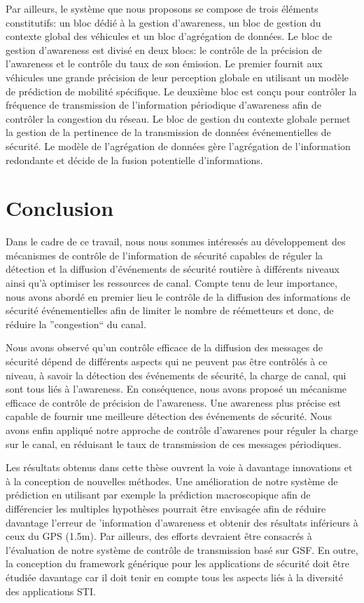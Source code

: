 Par ailleurs, le système que nous proposons se compose de trois éléments constitutifs: un bloc dédié à  la gestion d'awareness, un bloc de gestion du contexte global des véhicules et un bloc d'agrégation de données.
Le bloc de gestion d'awareness est divisé en deux blocs: le contrôle de la précision de l'awareness et le contrôle du taux de son émission. Le premier fournit aux véhicules une grande précision de leur perception globale en utilisant un modèle de prédiction de mobilité spécifique. Le deuxième bloc est conçu pour contrôler la fréquence de transmission de l'information périodique d'awareness afin de contrôler la congestion du réseau. Le bloc de gestion du contexte globale permet la gestion de la pertinence de la transmission de données événementielles de sécurité. Le modèle de l'agrégation de données gère l'agrégation de l'information redondante et décide de la fusion potentielle d'informations.

\section{Conclusion \label{conclusion}}

Dans le cadre de ce travail, nous nous sommes intéressés au développement des mécanismes de contrôle de l'information de sécurité capables de réguler la détection et la diffusion d'événements de sécurité routière à différents niveaux ainsi qu'à optimiser les ressources de canal.
Compte tenu de leur importance, nous avons abordé en premier lieu le contrôle de la diffusion des informations de sécurité événementielles afin de limiter le nombre de réémetteurs et donc, de réduire la ''congestion`` du canal.

Nous avons observé qu'un contrôle efficace de la diffusion des messages de sécurité dépend de différents aspects qui ne peuvent pas être contrôlés à ce niveau, à savoir la détection des événements de sécurité, la charge de canal, qui sont tous liés à l'awareness. En conséquence, nous avons proposé un mécanisme efficace de contrôle de précision de l'awareness.
Une awareness plus précise est capable de fournir une meilleure détection des événements de sécurité. Nous avons enfin appliqué notre approche de contrôle d'awarenes pour réguler la charge sur le canal, en réduisant le taux de transmission de ces messages périodiques.

Les résultats obtenus dans cette thèse ouvrent la voie à davantage innovations et à la conception de nouvelles méthodes.
Une amélioration de notre système de prédiction en utilisant par exemple la prédiction macroscopique afin de différencier les multiples hypothèses pourrait \^etre envisagée afin de réduire davantage l'erreur de 'information d'awareness et obtenir des résultats inférieurs à ceux du GPS (1.5m).
Par ailleurs, des efforts devraient être consacrés à l'évaluation de notre système de contrôle de transmission basé sur GSF.
En outre, la conception du framework générique pour les applications de sécurité doit être étudiée davantage car il doit tenir en compte tous les aspects liés à la diversité des applications STI.